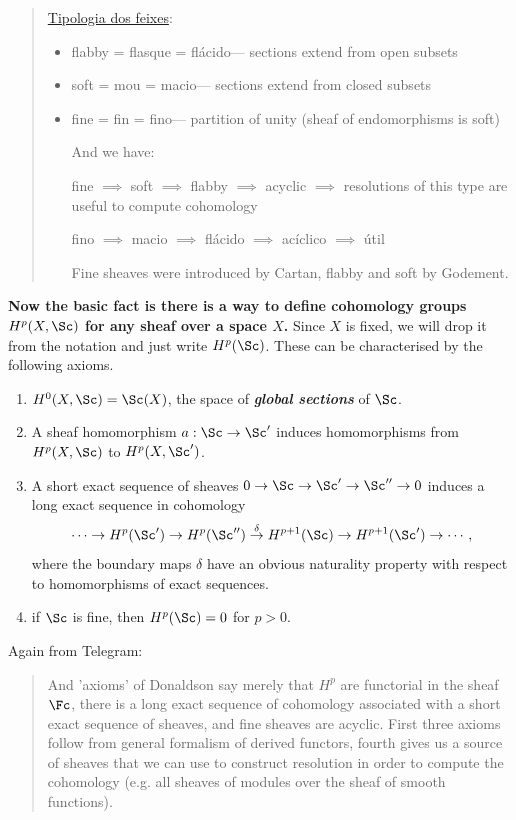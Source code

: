 \begin{quote}
	\href{https://fr.wikipedia.org/wiki/Faisceau_(mathématiques)#Typologie_des_faisceaux}{Tipologia dos feixes}:
	\begin{itemize}
		\item flabby = flasque
			= flácido--- sections extend from open subsets
		\item soft = mou
			= macio--- sections extend from closed subsets
		\item fine = fin
	 		= fino--- partition of unity (sheaf of endomorphisms is soft)
	
	And we have:
	
	fine $\implies$ soft $\implies$ flabby $\implies$ acyclic $\implies$ resolutions of this type are useful to compute cohomology
	
	fino $\implies$ macio $\implies$ flácido $\implies$ acíclico $\implies$ útil

	Fine sheaves were introduced by Cartan, flabby and soft by Godement.
	\end{itemize}
\end{quote}

\textbf{Now the basic fact is there is a way to define cohomology groups $H^p(X,\Sc)$ for any sheaf over a space $X$.} Since $X$ is fixed, we will drop it from the notation and just write $H^p(\Sc)$. These can be characterised by the following axioms.
\begin{enumerate}
	\item $H^0(X,\Sc)=\Sc(X)$, the space of \textbf{\textit{global sections}} of $\Sc$.
	\item A sheaf homomorphism $a:\Sc\to\Sc'$ induces homomorphisms from $H^p(X,\Sc)$ to $H^p(X,\Sc')$.
	\item A short exact sequence of sheaves $0\to\Sc\to\Sc'\to\Sc''\to0$ induces a long exact sequence in cohomology
	\[\cdots\to H^p(\Sc')\to H^p(\Sc'')\overset{\delta}{\to}H^{p+1}(\Sc)\to H^{p+1}(\Sc')\to\cdots,\]
	where the boundary maps $\delta$ have an obvious naturality property with respect to homomorphisms of exact sequences.
	\item if $\Sc$ is fine, then $H^p(\Sc)=0$ for $p>0$.
\end{enumerate}

Again from Telegram:
\begin{quote}
	And 'axioms' of Donaldson say merely that $H^p$ are functorial in the sheaf $\Fc$, there is a long exact sequence of cohomology associated with a short exact sequence of sheaves, and fine sheaves are acyclic. First three axioms follow from general formalism of derived functors, fourth gives us a source of sheaves that we can use to construct resolution in order to compute the cohomology (e.g. all sheaves of modules over the sheaf of smooth functions).
\end{quote}

